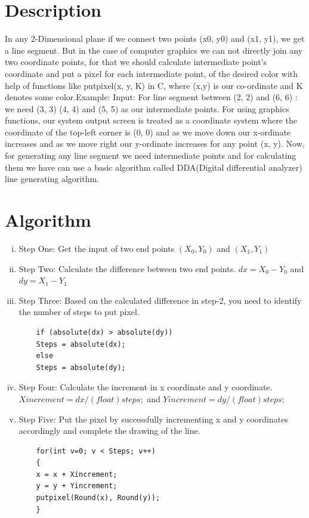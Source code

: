 \documentclass[11pt]{report}
\begin{document}
\section{Description}
In any 2-Dimensional plane if we connect two points (x0, y0) and (x1, y1), we get a line segment. But in the case of computer graphics we can not directly join any two coordinate points, for that we should calculate intermediate point’s coordinate and put a pixel for each intermediate point, of the desired color with help of functions like putpixel(x, y, K) in C, where (x,y) is our co-ordinate and K denotes some color.Example: Input: For line segment between (2, 2) and (6, 6) : we need (3, 3) (4, 4) and (5, 5) as our intermediate points.
For using graphics functions, our system output screen is treated as a coordinate system where the coordinate of the top-left corner is (0, 0) and as we move down our x-ordinate increases and as we move right our y-ordinate increases for any point (x, y).
Now, for generating any line segment we need intermediate points and for calculating them we have can use a basic algorithm called DDA(Digital differential analyzer) line generating algorithm.
\section{Algorithm}
\begin{enumerate}[(i)]
	\item Step One: 
	Get the input of two end points $(X_0 , Y_0)$  and  $(X_1 , Y_1)$
	\item Step Two: 
	Calculate the difference between two end points.
	\newline $dx = X_0 - Y_0$   and $dy = X_1 - Y_1$
	\item Step Three: 
	Based on the calculated difference in step-2, you need to identify the number of steps to put pixel. 
	\begin{lstlisting}
	if (absolute(dx) > absolute(dy))
	Steps = absolute(dx);
	else
	Steps = absolute(dy);
	\end{lstlisting}
	\item Step Four: 
	Calculate the increment in x coordinate and y coordinate.
	\newline $Xincrement = dx / (float) steps;$ and   $Yincrement = dy / (float) steps;$
	\item Step Five: 
	Put the pixel by successfully incrementing x and y coordinates accordingly and complete the drawing of the line.
	\begin{lstlisting}
	for(int v=0; v < Steps; v++)
	{
	x = x + Xincrement;
	y = y + Yincrement;
	putpixel(Round(x), Round(y));
	}
	\end{lstlisting}
\end{enumerate}
\end{document}
